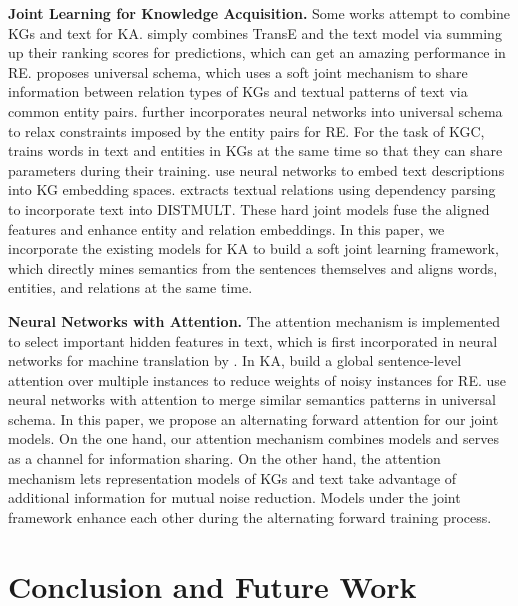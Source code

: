 \documentclass[letterpaper]{article} %
\begin{document}
\textbf{Joint Learning for Knowledge Acquisition.} Some works attempt to combine KGs and text for KA. \cite{weston2013connecting} simply combines TransE and the text model via summing up their ranking scores for predictions, which can get an amazing performance in RE. \cite{riedel2013relation} proposes universal schema, which uses a soft joint mechanism to share information between relation types of KGs and textual patterns of text via common entity pairs. \cite{vergaEtAl} further incorporates neural networks into universal schema to relax constraints imposed by the entity pairs for RE. For the task of KGC, \cite{wang2014knowledge} trains words in text and entities in KGs at the same time so that they can share parameters during their training. \cite{xie2016representation,wang2016text,wu2016knowledge} use neural networks to embed text descriptions into KG embedding spaces. \cite{toutanova2015representing} extracts textual relations using dependency parsing to incorporate text into DISTMULT. These hard joint models fuse the aligned features and enhance entity and relation embeddings. In this paper, we incorporate the existing models for KA to build a soft joint learning framework, which directly mines semantics from the sentences themselves and aligns words, entities, and relations at the same time.

\textbf{Neural Networks with Attention.} The attention mechanism is implemented to select important hidden features in text, which is first incorporated in neural networks for machine translation by \cite{bahdanau2014neural}. In KA, \cite{lin2016neural,luo-EtAl:2017:Long} build a global sentence-level attention over multiple instances to reduce weights of noisy instances for RE. \cite{vergamccallum} use neural networks with attention to merge similar semantics patterns in universal schema. In this paper, we propose an alternating forward attention for our joint models. On the one hand, our attention mechanism combines models and serves as a channel for information sharing. On the other hand, the attention mechanism lets representation models of KGs and text take advantage of additional information for mutual noise reduction. Models under the joint framework enhance each other during the alternating forward training process.


\section{Conclusion and Future Work}
\end{document}

